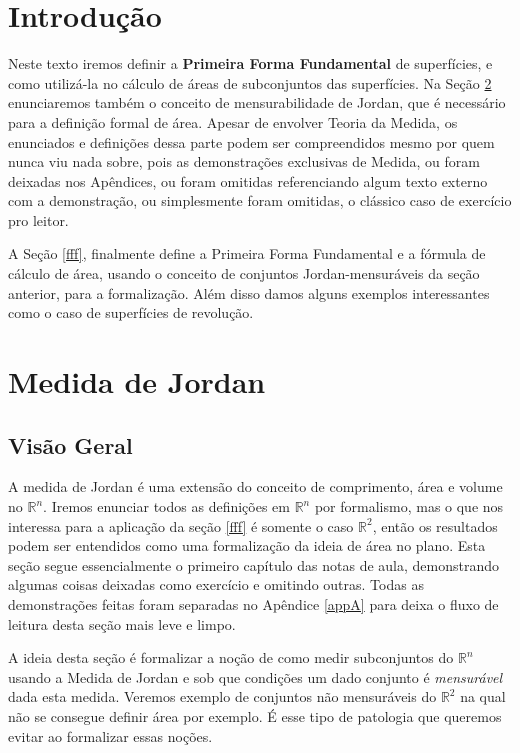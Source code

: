 \documentclass[12pt,letterpaper]{article}
\newcommand{\rr}{\mathbb{R}^2}
\newcommand{\rn}{\mathbb{R}^n}
\begin{document}
	\tableofcontents
	\newpage
	\section{Introdução}
		Neste texto iremos definir a \textbf{Primeira Forma Fundamental} de superfícies, e como utilizá-la no cálculo de áreas de subconjuntos das superfícies. Na Seção \ref{jordan} enunciaremos também o conceito de mensurabilidade de Jordan, que é necessário para a definição formal de área. Apesar de envolver Teoria da Medida, os enunciados e definições dessa parte podem ser compreendidos mesmo por quem nunca viu nada sobre, pois as demonstrações exclusivas de Medida, ou foram deixadas nos Apêndices, ou foram omitidas referenciando algum texto externo com a demonstração, ou simplesmente foram omitidas, o clássico caso de exercício pro leitor. 
		
		A Seção \ref{fff}, finalmente define a Primeira Forma Fundamental e a fórmula de cálculo de área, usando o conceito de conjuntos Jordan-mensuráveis da seção anterior, para a formalização. Além disso damos alguns exemplos interessantes como o caso de superfícies de revolução.
	\section{Medida de Jordan}
	\label{jordan}
\subsection{Visão Geral}
	A medida de Jordan é uma extensão do conceito de comprimento, área e volume no $\rn$. Iremos enunciar todos as definições em $\rn$ por formalismo, mas o que nos interessa para a aplicação da seção \ref{fff} é somente o caso $\rr$, então os resultados podem ser entendidos como uma formalização da ideia de área no plano. Esta seção segue essencialmente o primeiro capítulo das notas de aula\cite{math3}, demonstrando algumas coisas deixadas como exercício e omitindo outras. Todas as demonstrações feitas foram separadas no Apêndice \ref{appA} para deixa o fluxo de leitura desta seção mais leve e limpo.
	
	A ideia desta seção é formalizar a noção de como medir subconjuntos do $\rn$ usando a Medida de Jordan e sob que condições um dado conjunto é \textit{mensurável} dada esta medida. Veremos exemplo de conjuntos não mensuráveis do $\rr$ na qual não se consegue definir área por exemplo. É esse tipo de patologia que queremos evitar ao formalizar essas noções.
	
\end{document}
